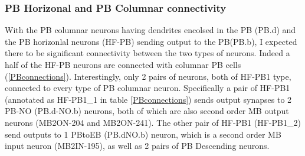     \subsubsection{PB Horizonal and PB Columnar connectivity}
    With the PB columnar neurons having dendrites encolsed in the PB (PB.d) and the PB horizonlal neurons (HF-PB) sending output to the PB(PB.b), I expected there to be significant connectivity between the two types of neurons. Indeed a half of the HF-PB neurons are connected with columnar PB cells (\ref{PBconnections}).  Interestingly, only 2 pairs of neurons, both of HF-PB1 type, connected to every type of PB columnar neuron. Specifically a pair of HF-PB1 (annotated as HF-PB1\_1 in table \ref{PBconnections}) sends output synapses to 2 PB-NO (PB.d-NO.b) neurons, both of which are also second order MB output neurons (MB2ON-204 and MB2ON-241). The other pair of  HF-PB1 (HF-PB1\_2) send outputs to 1 PBtoEB (PB.dNO.b) neuron, which is a second order MB input neuron (MB2IN-195), as well as 2 pairs of PB Descending neurons. 


